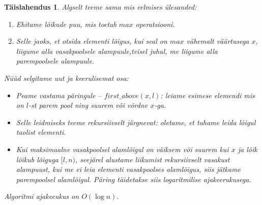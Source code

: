 \documentclass{trkut}
\newtheorem*{solution}{Täislahendus}
\begin{document}
\begin{solution}
Algselt teeme sama mis eelmises ülesanded: 
\begin{enumerate}
\item Ehitame lõikude puu, mis toetab $max$ operatsiooni.
\item Selle jaoks, et otsida elementi lõigus, kui seal on $max$ vähemalt väärtusega $x$, liigume alla vasakpoolsele alampuule,teisel juhul, me liigume alla parempoolsele alampuule.
\end{enumerate}


Nüüd selgitame uut ja keerulisemat osa:
\begin{itemize}
\item Peame vastama päringule -- $first\_above(x,l)$: leiame esimese elemendi mis on $l$-st parem pool ning suurem või võrdne $x$-ga.
\item Selle leidmiseks teeme rekursiivselt järgnevat: oletame, et tahame leida lõigul taolist elementi. 
\item Kui maksimaalne vasakpoolsel alamlõigul on väiksem või suurem kui $x$ ja lõik lõikub lõiguga $[l,n)$, seejärel alustame liikumist rekursiivselt vasakust alampuust, kui me ei leia elementi vasakpoolses alamlõigus, siis jätkame parempoolsel alamlõigul. Päring täidetakse siis logaritmilise ajakeerukusega. 
\end{itemize}
Algoritmi ajakeeukus on $O(\log n)$.
\end{solution}
\end{document}
